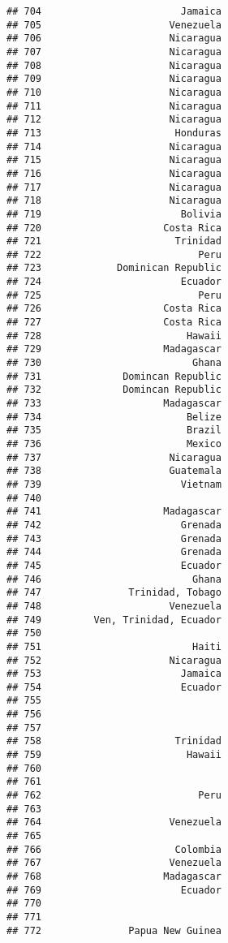 \documentclass[
]{article}
\begin{document}
\begin{verbatim}
## 704                        Jamaica
## 705                      Venezuela
## 706                      Nicaragua
## 707                      Nicaragua
## 708                      Nicaragua
## 709                      Nicaragua
## 710                      Nicaragua
## 711                      Nicaragua
## 712                      Nicaragua
## 713                       Honduras
## 714                      Nicaragua
## 715                      Nicaragua
## 716                      Nicaragua
## 717                      Nicaragua
## 718                      Nicaragua
## 719                        Bolivia
## 720                     Costa Rica
## 721                       Trinidad
## 722                           Peru
## 723             Dominican Republic
## 724                        Ecuador
## 725                           Peru
## 726                     Costa Rica
## 727                     Costa Rica
## 728                         Hawaii
## 729                     Madagascar
## 730                          Ghana
## 731              Domincan Republic
## 732              Domincan Republic
## 733                     Madagascar
## 734                         Belize
## 735                         Brazil
## 736                         Mexico
## 737                      Nicaragua
## 738                      Guatemala
## 739                        Vietnam
## 740                               
## 741                     Madagascar
## 742                        Grenada
## 743                        Grenada
## 744                        Grenada
## 745                        Ecuador
## 746                          Ghana
## 747               Trinidad, Tobago
## 748                      Venezuela
## 749         Ven, Trinidad, Ecuador
## 750                               
## 751                          Haiti
## 752                      Nicaragua
## 753                        Jamaica
## 754                        Ecuador
## 755                               
## 756                               
## 757                               
## 758                       Trinidad
## 759                         Hawaii
## 760                               
## 761                               
## 762                           Peru
## 763                               
## 764                      Venezuela
## 765                               
## 766                       Colombia
## 767                      Venezuela
## 768                     Madagascar
## 769                        Ecuador
## 770                               
## 771                               
## 772               Papua New Guinea

\end{verbatim}
\end{document}
